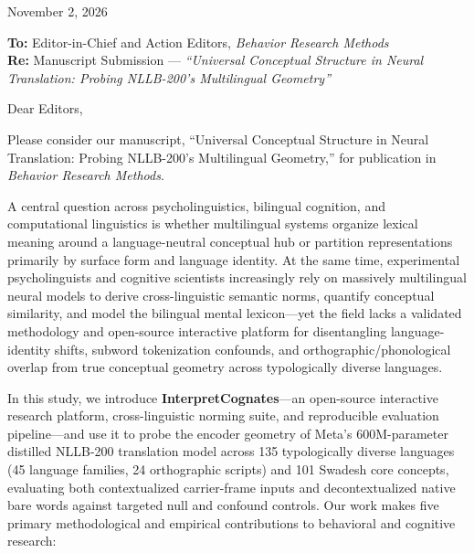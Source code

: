 \documentclass[11pt,a4paper]{article}
\begin{document}
November 2, 2026

\textbf{To:} Editor-in-Chief and Action Editors, \textit{Behavior Research Methods} \\
\textbf{Re:} Manuscript Submission --- \textit{``Universal Conceptual Structure in Neural Translation: Probing NLLB-200's Multilingual Geometry''}

Dear Editors,

Please consider our manuscript, ``Universal Conceptual Structure in Neural Translation: Probing NLLB-200's Multilingual Geometry,'' for publication in \textit{Behavior Research Methods}.

A central question across psycholinguistics, bilingual cognition, and computational linguistics is whether multilingual systems organize lexical meaning around a language-neutral conceptual hub or partition representations primarily by surface form and language identity. At the same time, experimental psycholinguists and cognitive scientists increasingly rely on massively multilingual neural models to derive cross-linguistic semantic norms, quantify conceptual similarity, and model the bilingual mental lexicon---yet the field lacks a validated methodology and open-source interactive platform for disentangling language-identity shifts, subword tokenization confounds, and orthographic/phonological overlap from true conceptual geometry across typologically diverse languages.

In this study, we introduce \textbf{InterpretCognates}---an open-source interactive research platform, cross-linguistic norming suite, and reproducible evaluation pipeline---and use it to probe the encoder geometry of Meta's 600M-parameter distilled NLLB-200 translation model across 135 typologically diverse languages (45 language families, 24 orthographic scripts) and 101 Swadesh core concepts, evaluating both contextualized carrier-frame inputs and decontextualized native bare words against targeted null and confound controls. Our work makes five primary methodological and empirical contributions to behavioral and cognitive research:
\end{document}

